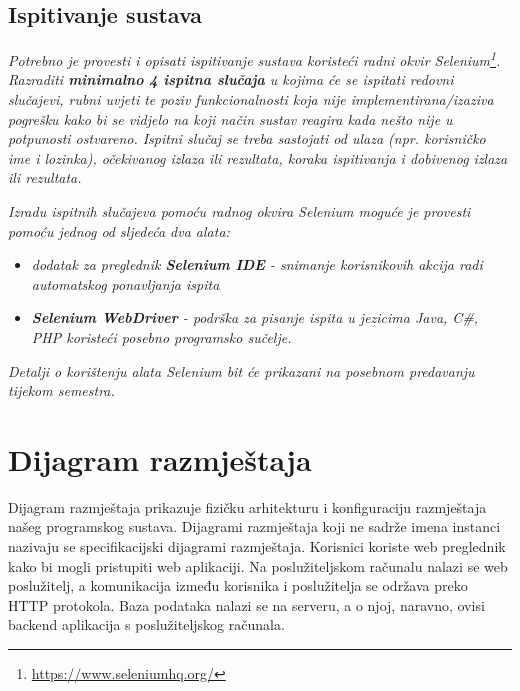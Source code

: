 			
			
			\subsection{Ispitivanje sustava}
			
			 \textit{Potrebno je provesti i opisati ispitivanje sustava koristeći radni okvir Selenium\footnote{\url{https://www.seleniumhq.org/}}. Razraditi \textbf{minimalno 4 ispitna slučaja} u kojima će se ispitati redovni slučajevi, rubni uvjeti te poziv funkcionalnosti koja nije implementirana/izaziva pogrešku kako bi se vidjelo na koji način sustav reagira kada nešto nije u potpunosti ostvareno. Ispitni slučaj se treba sastojati od ulaza (npr. korisničko ime i lozinka), očekivanog izlaza ili rezultata, koraka ispitivanja i dobivenog izlaza ili rezultata.\\ }
			 
			 \textit{Izradu ispitnih slučajeva pomoću radnog okvira Selenium moguće je provesti pomoću jednog od sljedeća dva alata:}
			 \begin{itemize}
			 	\item \textit{dodatak za preglednik \textbf{Selenium IDE} - snimanje korisnikovih akcija radi automatskog ponavljanja ispita	}
			 	\item \textit{\textbf{Selenium WebDriver} - podrška za pisanje ispita u jezicima Java, C\#, PHP koristeći posebno programsko sučelje.}
			 \end{itemize}
		 	\textit{Detalji o korištenju alata Selenium bit će prikazani na posebnom predavanju tijekom semestra.}
			
			\eject 
		
		
		\section{Dijagram razmještaja}
			
		\noindent Dijagram razmještaja prikazuje fizičku arhitekturu i konfiguraciju razmještaja našeg programskog sustava. Dijagrami razmještaja koji ne sadrže imena instanci nazivaju se specifikacijski dijagrami razmještaja. Korisnici koriste web preglednik kako bi mogli pristupiti web aplikaciji. Na poslužiteljskom računalu nalazi se web poslužitelj, a komunikacija između korisnika i poslužitelja se održava preko HTTP protokola. Baza podataka nalazi se na serveru, a o njoj, naravno, ovisi backend aplikacija s poslužiteljskog računala.
			
